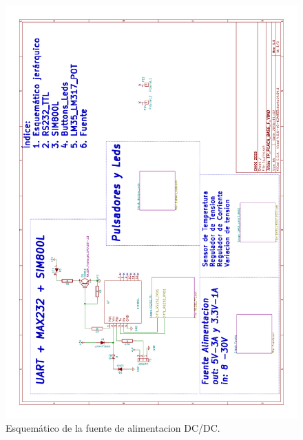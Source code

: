 \begin{figure}[h]
      \centering
      \includegraphics[page=3,scale=0.3,angle=270]{./Figures/schematic.pdf}
      \caption{Esquemático de la fuente de alimentacion DC/DC.}
      \label{fig:fuente}
\end{figure}

